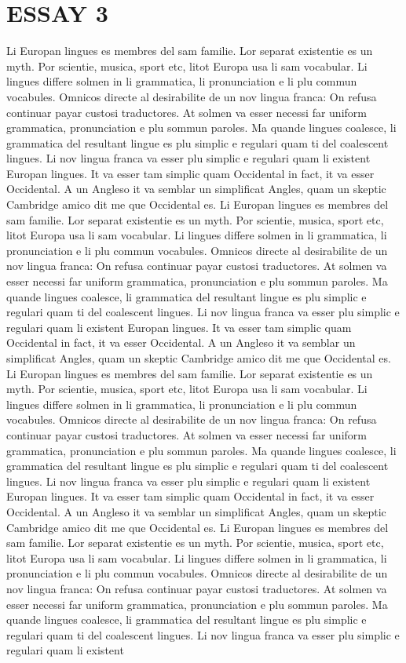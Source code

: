 \chapter{ESSAY 3}
\label{essay3}

Li Europan lingues es membres del sam familie. Lor separat existentie es un myth. Por scientie, musica, sport etc, litot Europa usa li sam vocabular. Li lingues differe solmen in li grammatica, li pronunciation e li plu commun vocabules. Omnicos directe al desirabilite de un nov lingua franca: On refusa continuar payar custosi traductores. At solmen va esser necessi far uniform grammatica, pronunciation e plu sommun paroles. Ma quande lingues coalesce, li grammatica del resultant lingue es plu simplic e regulari quam ti del coalescent lingues. Li nov lingua franca va esser plu simplic e regulari quam li existent Europan lingues. It va esser tam simplic quam Occidental in fact, it va esser Occidental. A un Angleso it va semblar un simplificat Angles, quam un skeptic Cambridge amico dit me que Occidental es. Li Europan lingues es membres del sam familie. Lor separat existentie es un myth. Por scientie, musica, sport etc, litot Europa usa li sam vocabular. Li lingues differe solmen in li grammatica, li pronunciation e li plu commun vocabules. Omnicos directe al desirabilite de un nov lingua franca: On refusa continuar payar custosi traductores. At solmen va esser necessi far uniform grammatica, pronunciation e plu sommun paroles. Ma quande lingues coalesce, li grammatica del resultant lingue es plu simplic e regulari quam ti del coalescent lingues. Li nov lingua franca va esser plu simplic e regulari quam li existent Europan lingues. It va esser tam simplic quam Occidental in fact, it va esser Occidental. A un Angleso it va semblar un simplificat Angles, quam un skeptic Cambridge amico dit me que Occidental es. Li Europan lingues es membres del sam familie. Lor separat existentie es un myth. Por scientie, musica, sport etc, litot Europa usa li sam vocabular. Li lingues differe solmen in li grammatica, li pronunciation e li plu commun vocabules. Omnicos directe al desirabilite de un nov lingua franca: On refusa continuar payar custosi traductores. At solmen va esser necessi far uniform grammatica, pronunciation e plu sommun paroles. Ma quande lingues coalesce, li grammatica del resultant lingue es plu simplic e regulari quam ti del coalescent lingues. Li nov lingua franca va esser plu simplic e regulari quam li existent Europan lingues. It va esser tam simplic quam Occidental in fact, it va esser Occidental. A un Angleso it va semblar un simplificat Angles, quam un skeptic Cambridge amico dit me que Occidental es. Li Europan lingues es membres del sam familie. Lor separat existentie es un myth. Por scientie, musica, sport etc, litot Europa usa li sam vocabular. Li lingues differe solmen in li grammatica, li pronunciation e li plu commun vocabules. Omnicos directe al desirabilite de un nov lingua franca: On refusa continuar payar custosi traductores. At solmen va esser necessi far uniform grammatica, pronunciation e plu sommun paroles. Ma quande lingues coalesce, li grammatica del resultant lingue es plu simplic e regulari quam ti del coalescent lingues. Li nov lingua franca va esser plu simplic e regulari quam li existent 